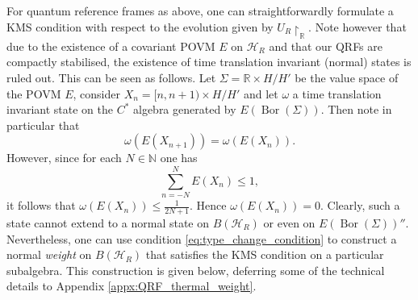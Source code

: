 \documentclass[sn-mathphys-num]{sn-jnl}%
\newcommand{\RR}{\mathbb{R}}
\newcommand{\HH}{\mathcal{H}}
\DeclareMathOperator{\Bor}{Bor}
\numberwithin{equation}{section}
\theoremstyle{thmstyleone}%
\theoremstyle{thmstyletwo}%
\theoremstyle{thmstylethree}%
\begin{document}
For quantum reference frames as above, one can straightforwardly formulate a KMS condition with respect to the evolution given by $U_R\restriction_\RR$. Note however that due to the existence of a covariant POVM $E$ on $\HH_R$ and that our QRFs are compactly stabilised, the existence of time translation invariant (normal) states is ruled out. This can be seen as follows. Let $\Sigma=\RR\times H/H'$ be the value space of the POVM $E$, consider $X_n=[n,n+1)\times H/H'$ and let $\omega$ a time translation invariant state on the $C^*$ algebra generated by $E(\Bor(\Sigma))$. Then note in particular that
\begin{equation}
    \omega(E(X_{n+1}))=\omega(E(X_n)).
\end{equation}
However, since for each $N\in\mathbb{N}$ one has
\begin{equation}
    \sum_{n=-N}^N E(X_n)\leq 1,
\end{equation}
it follows that $\omega(E(X_n))\leq \frac{1}{2N+1}$. Hence $\omega(E(X_n))=0$. Clearly, such a state cannot extend to a normal state on $B(\HH_R)$ or even on $E(\Bor(\Sigma))''$. Nevertheless, one can use condition \eqref{eq:type_change_condition} to construct a normal \textit{weight} on $B(\HH_R)$ that satisfies the KMS condition on a particular subalgebra. This construction is given below, deferring some of the technical details to Appendix \ref{appx:QRF_thermal_weight}.
\end{document}
